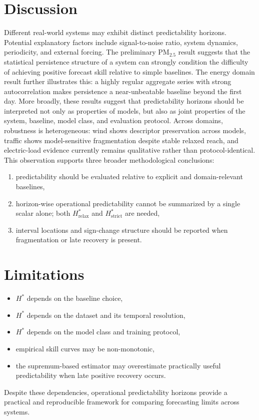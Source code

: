 \documentclass[11pt]{article}
\begin{document}
\section{Discussion}
Different real-world systems may exhibit distinct predictability horizons.
Potential explanatory factors include signal-to-noise ratio, system dynamics, periodicity, and external forcing.
The preliminary PM$_{2.5}$ result suggests that the statistical persistence structure of a system can strongly condition the difficulty of achieving positive forecast skill relative to simple baselines.
The energy domain result further illustrates this: a highly regular aggregate series with strong autocorrelation makes persistence a near-unbeatable baseline beyond the first day.
More broadly, these results suggest that predictability horizons should be interpreted not only as properties of models, but also as joint properties of the system, baseline, model class, and evaluation protocol.
Across domains, robustness is heterogeneous: wind shows descriptor preservation across models, traffic shows model-sensitive fragmentation despite stable relaxed reach, and electric-load evidence currently remains qualitative rather than protocol-identical.
This observation supports three broader methodological conclusions:
\begin{enumerate}
  \item predictability should be evaluated relative to explicit and domain-relevant baselines,
  \item horizon-wise operational predictability cannot be summarized by a single scalar alone; both $H^*_{\mathrm{relax}}$ and $H^*_{\mathrm{strict}}$ are needed,
  \item interval locations and sign-change structure should be reported when fragmentation or late recovery is present.
\end{enumerate}

\section{Limitations}
\begin{itemize}
  \item $H^*$ depends on the baseline choice,
  \item $H^*$ depends on the dataset and its temporal resolution,
  \item $H^*$ depends on the model class and training protocol,
  \item empirical skill curves may be non-monotonic,
  \item the supremum-based estimator may overestimate practically useful predictability when late positive recovery occurs.
\end{itemize}
Despite these dependencies, operational predictability horizons provide a practical and reproducible framework for comparing forecasting limits across systems.
\end{document}
